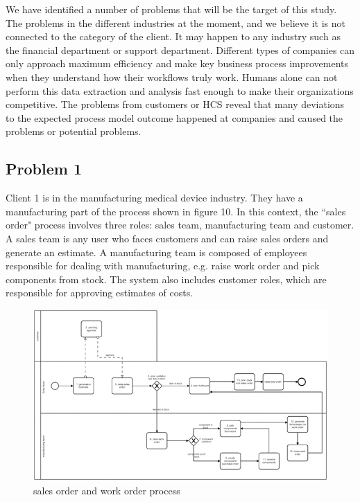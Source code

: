 We have identified a number of problems that will be the target of this study. The problems in the different industries at the moment, and we believe it is not connected to the category of the client. It may happen to any industry such as the financial department or support department. Different types of companies can only approach maximum efficiency and make key business process improvements when they understand how their workflows truly work. Humans alone can not perform this data extraction and analysis fast enough to make their organizations competitive. The problems from customers or HCS reveal that many deviations to the expected process model outcome happened at companies and caused the problems or potential problems.



\subsection{Problem 1}
Client 1 is in the manufacturing medical device industry. They have a manufacturing part of the process shown in figure 10. In this context, the “sales order" process involves three roles: sales team, manufacturing team and customer. A sales team is any user who faces customers and can raise sales orders and generate an estimate. A manufacturing team is composed of employees responsible for dealing with manufacturing, e.g. raise work order and pick components from stock. The system also includes customer roles, which are responsible for approving estimates of costs.

\begin{figure}[!htb]
    \centering 
    \includegraphics[scale=0.9]{resource/soAndwo.png}
    \caption{sales order and work order process}
    \label{figure:soAndwo}
\end{figure}

